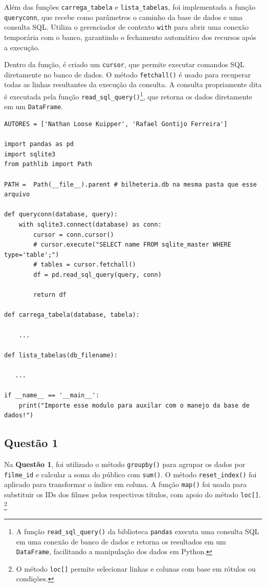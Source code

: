 \documentclass{article}
\begin{document}
Além das funções \texttt{carrega\_tabela} e \texttt{lista\_tabelas}, foi implementada a função \texttt{queryconn}, que recebe como parâmetros o caminho da base de dados e uma consulta SQL. Utiliza o gerenciador de contexto \texttt{with} para abrir uma conexão temporária com o banco, garantindo o fechamento automático dos recursos após a execução.

Dentro da função, é criado um \texttt{cursor}, que permite executar comandos SQL diretamente no banco de dados. O método \texttt{fetchall()} é usado para recuperar todas as linhas resultantes da execução da consulta. A consulta propriamente dita é executada pela função \texttt{read\_sql\_query()}\footnote{A função \texttt{read\_sql\_query()} da biblioteca \texttt{pandas} executa uma consulta SQL em uma conexão de banco de dados e retorna os resultados em um \texttt{DataFrame}, facilitando a manipulação dos dados em Python.}, que retorna os dados diretamente em um \texttt{DataFrame}.


\linespread{1}
\begin{lstlisting}
AUTORES = ['Nathan Loose Kuipper', 'Rafael Gontijo Ferreira']

import pandas as pd 
import sqlite3
from pathlib import Path

PATH =  Path(__file__).parent # bilheteria.db na mesma pasta que esse arquivo

def queryconn(database, query):    
    with sqlite3.connect(database) as conn:
        cursor = conn.cursor()
        # cursor.execute("SELECT name FROM sqlite_master WHERE type='table';")
        # tables = cursor.fetchall() 
        df = pd.read_sql_query(query, conn)

        return df
    
def carrega_tabela(database, tabela):

    ...

def lista_tabelas(db_filename):

   ...
    
if __name__ == '__main__':
    print("Importe esse modulo para auxilar com o manejo da base de dados!")
\end{lstlisting}
\pagebreak
\linespread{1.5}
\subsection*{Questão 1}
Na \textbf{Questão 1}, foi utilizado o método \texttt{groupby()} para agrupar os dados por \texttt{filme\_id} e calcular a soma do público com \texttt{sum()}. O método \texttt{reset\_index()} foi aplicado para transformar o índice em coluna. A função \texttt{map()} foi usada para substituir os IDs dos filmes pelos respectivos títulos, com apoio do método \texttt{loc[]}.  \footnote{O método \texttt{loc[]} permite selecionar linhas e colunas com base em rótulos ou condições.}
\end{document}
